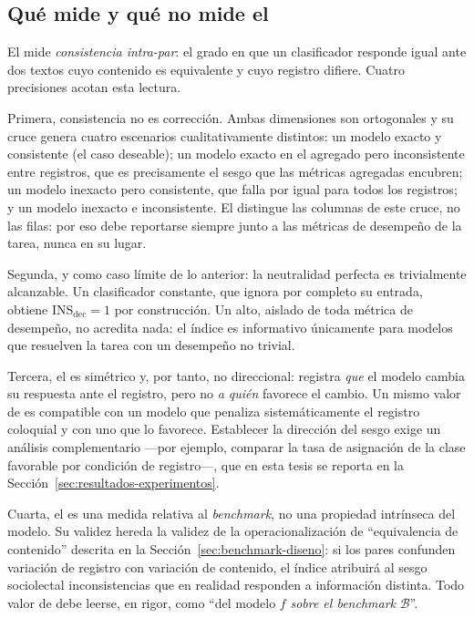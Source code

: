 \subsection{Qué mide y qué no mide el \INS}

El \INS mide \emph{consistencia intra-par}: el grado en que un clasificador
responde igual ante dos textos cuyo contenido es equivalente y cuyo registro
difiere. Cuatro precisiones acotan esta lectura.

Primera, consistencia no es corrección. Ambas dimensiones son ortogonales y
su cruce genera cuatro escenarios cualitativamente distintos: un modelo
exacto y consistente (el caso deseable); un modelo exacto en el agregado pero
inconsistente entre registros, que es precisamente el sesgo que las métricas
agregadas encubren; un modelo inexacto pero consistente, que falla por igual
para todos los registros; y un modelo inexacto e inconsistente. El \INS
distingue las columnas de este cruce, no las filas: por eso debe reportarse
siempre junto a las métricas de desempeño de la tarea, nunca en su lugar.

Segunda, y como caso límite de lo anterior: la neutralidad perfecta es
trivialmente alcanzable. Un clasificador constante, que ignora por completo
su entrada, obtiene $\mathrm{INS}_{\mathrm{dec}} = 1$ por construcción. Un
\INS alto, aislado de toda métrica de desempeño, no acredita nada: el índice
es informativo únicamente para modelos que resuelven la tarea con un
desempeño no trivial.

Tercera, el \INS es simétrico y, por tanto, no direccional: registra
\emph{que} el modelo cambia su respuesta ante el registro, pero no
\emph{a quién} favorece el cambio. Un mismo valor de \INS es compatible con
un modelo que penaliza sistemáticamente el registro coloquial y con uno que
lo favorece. Establecer la dirección del sesgo exige un análisis
complementario ---por ejemplo, comparar la tasa de asignación de la clase
favorable por condición de registro---, que en esta tesis se reporta en la
Sección~\ref{sec:resultados-experimentos}.

Cuarta, el \INS es una medida relativa al \emph{benchmark}, no una propiedad
intrínseca del modelo. Su validez hereda la validez de la operacionalización
de ``equivalencia de contenido'' descrita en la
Sección~\ref{sec:benchmark-diseno}: si los pares confunden variación de
registro con variación de contenido, el índice atribuirá al sesgo
sociolectal inconsistencias que en realidad responden a información
distinta. Todo valor de \INS debe leerse, en rigor, como
``\INS del modelo $f$ \emph{sobre el benchmark} $\mathcal{B}$''.

